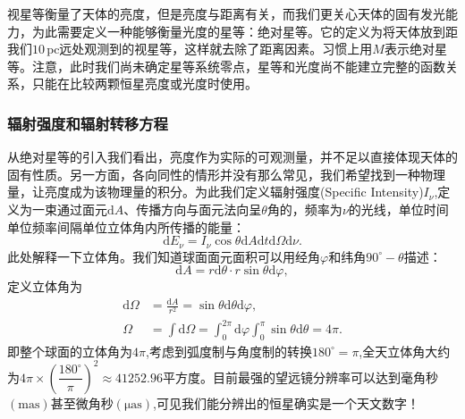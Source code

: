 \documentclass[../天体物理基础.tex]{subfiles}
\begin{document}
视星等衡量了天体的亮度，但是亮度与距离有关，而我们更关心天体的固有发光能力，为此需要定义一种能够衡量光度的星等：绝对星等。它的定义为将天体放到距我们$10\,\mathrm{pc}$远处观测到的视星等，这样就去除了距离因素。习惯上用$M$表示绝对星等。注意，此时我们尚未确定星等系统零点，星等和光度尚不能建立完整的函数关系，只能在比较两颗恒星亮度或光度时使用。

\subsubsection{辐射强度和辐射转移方程}
从绝对星等的引入我们看出，亮度作为实际的可观测量，并不足以直接体现天体的固有性质。另一方面，各向同性的情形并没有那么常见，我们希望找到一种物理量，让亮度成为该物理量的积分。为此我们定义辐射强度(Specific Intensity)$I_{\nu}$,定义为一束通过面元$\mathrm{d}A$、传播方向与面元法向呈$\theta$角的，频率为$\nu$的光线，单位时间单位频率间隔单位立体角内所传播的能量：
\begin{equation}
\mathrm{d}E_{\nu}=I_{\nu}\cos\theta\mathrm{d}A\mathrm{d}t\mathrm{d}\Omega\mathrm{d}\nu.
\end{equation}
此处解释一下立体角。我们知道球面面元面积可以用经角$\varphi$和纬角$90^{\circ}-\theta$描述：
\begin{equation}
\mathrm{d}A=r\mathrm{d}\theta\cdot r\sin\theta\mathrm{d}\varphi,
\end{equation}
定义立体角为
\begin{align}
\mathrm{d}\Omega&=\frac{\mathrm{d}A}{r^{2}}=\sin\theta\mathrm{d}\theta\mathrm{d}\varphi,\\
\Omega&=\int\mathrm{d}\Omega=\int_{0}^{2\pi}\mathrm{d}\varphi\int_{0}^{\pi}\sin\theta\mathrm{d}\theta=4\pi.
\end{align}
即整个球面的立体角为$4\pi$,考虑到弧度制与角度制的转换$180^{\circ}=\pi$,全天立体角大约为$4\pi\times\left(\dfrac{180^{\circ}}{\pi}\right)^{2}\approx41252.96$平方度。目前最强的望远镜分辨率可以达到毫角秒$(\mathrm{mas})$甚至微角秒$(\mathrm{\mu as})$,可见我们能分辨出的恒星确实是一个天文数字！
\end{document}
